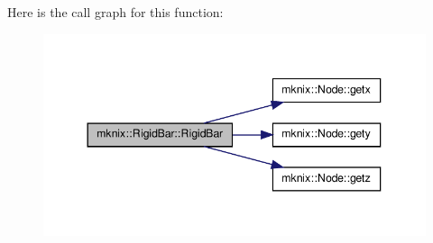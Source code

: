 Here is the call graph for this function\-:\nopagebreak
\begin{figure}[H]
\begin{center}
\leavevmode
\includegraphics[width=344pt]{d6/dd9/classmknix_1_1_rigid_bar_ac47bc0c8fc15e799f67a76925b5919bf_cgraph}
\end{center}
\end{figure}


